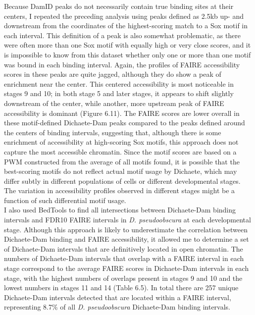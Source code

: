 Because DamID peaks do not necessarily contain true binding sites at their centers, I repeated the preceding analysis using peaks defined as 2.5kb up- and downstream from the coordinates of the highest-scoring match to a Sox motif in each interval. This definition of a peak is also somewhat problematic, as there were often more than one Sox motif with equally high or very close scores, and it is impossible to know from this dataset whether only one or more than one motif was bound in each binding interval. Again, the profiles of FAIRE accessibility scores in these peaks are quite jagged, although they do show a peak of enrichment near the center. This centered accessibility is most noticeable in stages 9 and 10; in both stage 5 and later stages, it appears to shift slightly downstream of the center, while another, more upstream peak of FAIRE accessibility is dominant (Figure 6.11). The FAIRE scores are lower overall in these motif-defined Dichaete-Dam peaks compared to the peaks defined around the centers of binding intervals, suggesting that, although there is some enrichment of accessibility at high-scoring Sox motifs, this approach does not capture the most accessible chromatin. Since the motif scores are based on a PWM constructed from the average of all motifs found, it is possible that the best-scoring motifs do not reflect actual motif usage by Dichaete, which may differ subtly in different populations of cells or different developmental stages. The variation in accessibility profiles observed in different stages might be a function of such differential motif usage.\\

I also used BedTools to find all intersections between Dichaete-Dam binding intervals and FDR10 FAIRE intervals in \emph{D. pseudoobscura} at each developmental stage. Although this approach is likely to underestimate the correlation between Dichaete-Dam binding and FAIRE accessibility, it allowed me to determine a set of Dichaete-Dam intervals that are definitively located in open chromatin. The numbers of Dichaete-Dam intervals that overlap with a FAIRE interval in each stage correspond to the average FAIRE scores in Dichaete-Dam intervals in each stage, with the highest numbers of overlaps present in stages 9 and 10 and the lowest numbers in stages 11 and 14 (Table 6.5). In total there are 257 unique Dichaete-Dam intervals detected that are located within a FAIRE interval, representing 8.7\% of all \emph{D. pseudoobscura} Dichaete-Dam binding intervals.\\ 

